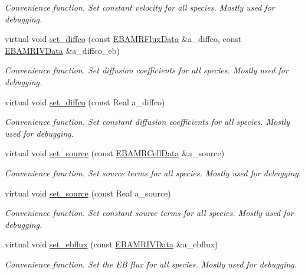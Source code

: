 \begin{DoxyCompactItemize}
\begin{DoxyCompactList}\small\item\em Convenience function. Set constant velocity for all species. Mostly used for debugging. \end{DoxyCompactList}\item 
virtual void \hyperlink{classcdr__layout_a084f2431835af0c691aa5a09c2f0c638}{set\+\_\+diffco} (const \hyperlink{type__definitions_8H_aadad278b2e5d3d4abcf9032f90ba78c3}{E\+B\+A\+M\+R\+Flux\+Data} \&a\+\_\+diffco, const \hyperlink{type__definitions_8H_a6b8fa905d55cbb491b52180386f0e0c1}{E\+B\+A\+M\+R\+I\+V\+Data} \&a\+\_\+diffco\+\_\+eb)
\begin{DoxyCompactList}\small\item\em Convenience function. Set diffusion coefficients for all species. Mostly used for debugging. \end{DoxyCompactList}\item 
virtual void \hyperlink{classcdr__layout_a5939d7a14328b3a66072facc0bfb1cc1}{set\+\_\+diffco} (const Real a\+\_\+diffco)
\begin{DoxyCompactList}\small\item\em Convenience function. Set constant diffusion coefficients for all species. Mostly used for debugging. \end{DoxyCompactList}\item 
virtual void \hyperlink{classcdr__layout_aa11365916b2edf83d1e2809e800845bc}{set\+\_\+source} (const \hyperlink{type__definitions_8H_a7e610f301989e5e07781c5e338bdb7c3}{E\+B\+A\+M\+R\+Cell\+Data} \&a\+\_\+source)
\begin{DoxyCompactList}\small\item\em Convenience function. Set source terms for all species. Mostly used for debugging. \end{DoxyCompactList}\item 
virtual void \hyperlink{classcdr__layout_a3c689fe3d47e8a683fb00648b788daa7}{set\+\_\+source} (const Real a\+\_\+source)
\begin{DoxyCompactList}\small\item\em Convenience function. Set constant source terms for all species. Mostly used for debugging. \end{DoxyCompactList}\item 
virtual void \hyperlink{classcdr__layout_ad0cd54b4ff3f9cb5d27694a41a65c5aa}{set\+\_\+ebflux} (const \hyperlink{type__definitions_8H_a6b8fa905d55cbb491b52180386f0e0c1}{E\+B\+A\+M\+R\+I\+V\+Data} \&a\+\_\+ebflux)
\begin{DoxyCompactList}\small\item\em Convenience function. Set the EB flux for all species. Mostly used for debugging. \end{DoxyCompactList}\item 

\end{DoxyCompactItemize}
